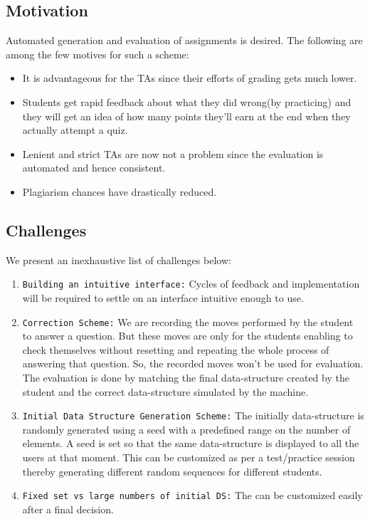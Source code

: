 \documentclass[aps,letterpaper,12pt]{revtex4}
\begin{document}
\subsection{Motivation}
Automated generation and evaluation of assignments is desired. The following are among the few motives for such a scheme:
\begin{itemize}
	\item It is advantageous for the TAs since their efforts of grading gets much lower.
	\item Students get rapid feedback about what they did wrong(by practicing) and they will get an idea of how many points they’ll earn at the end when they actually attempt a quiz.
	\item Lenient and strict TAs are now not a problem since the evaluation is automated and hence consistent.
	\item Plagiarism chances have drastically reduced.
\end{itemize}

\subsection{Challenges}
We present an inexhaustive list of challenges below:
\begin{enumerate}
\item \texttt{Building an intuitive interface:} Cycles of feedback and implementation will be required to settle on an interface intuitive enough to use.
\item \texttt{Correction Scheme:} We are recording the moves performed by the student to answer a question. But these moves are only for the students enabling to check themselves without resetting and repeating the whole process of answering that question. So, the recorded moves won't be used for evaluation. The evaluation is done by matching the final data-structure created by the student and the correct data-structure simulated by the machine.
\item \texttt{Initial Data Structure Generation Scheme:} The initially data-structure is randomly generated using a seed with a predefined range on the number of elements. A seed is set so that the same data-structure is displayed to all the users at that moment. This can be customized as per a test/practice session thereby generating different random sequences for different students.
\item \texttt{Fixed set vs large numbers of initial DS:} The can be customized easily after a final decision.
\end{enumerate}
\end{document}
